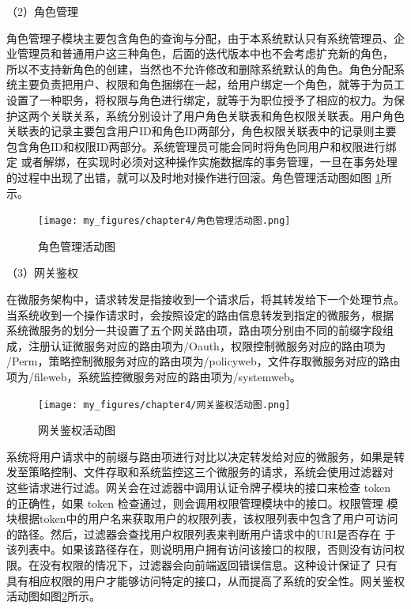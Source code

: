 
（2）角色管理

角色管理子模块主要包含角色的查询与分配，由于本系统默认只有系统管理员、企业管理员和普通用户这三种角色，后面的迭代版本中也不会考虑扩充新的角色，
所以不支持新角色的创建，当然也不允许修改和删除系统默认的角色。角色分配系统主要负责把用户、权限和角色捆绑在一起，给用户绑定一个角色，就等于为员工
设置了一种职务，将权限与角色进行绑定，就等于为职位授予了相应的权力。为保护这两个关联关系，系统分别设计了用户角色关联表和角色权限关联表。用户角色
关联表的记录主要包含用户ID和角色ID两部分，角色权限关联表中的记录则主要包含角色ID和权限ID两部分。系统管理员可能会同时将角色同用户和权限进行绑定
或者解绑，在实现时必须对这种操作实施数据库的事务管理，一旦在事务处理的过程中出现了出错，就可以及时地对操作进行回滚。角色管理活动图如图
\ref{fig:角色管理活动图}所示。

\begin{figure}[h]
    \centering
    \texttt{[image: my\_figures/chapter4/角色管理活动图.png]}
    \caption{角色管理活动图}
    \label{fig:角色管理活动图}
\end{figure}

（3）网关鉴权

在微服务架构中，请求转发是指接收到一个请求后，将其转发给下一个处理节点。当系统收到一个操作请求时，会按照设定的路由信息转发到指定的微服务，根据
系统微服务的划分一共设置了五个网关路由项，路由项分别由不同的前缀字段组成，注册认证微服务对应的路由项为/Oauth，权限控制微服务对应的路由项为
/Perm，策略控制微服务对应的路由项为/policyweb，文件存取微服务对应的路由项为/fileweb，系统监控微服务对应的路由项为/systemweb。

\begin{figure}[h]
    \centering
    \texttt{[image: my\_figures/chapter4/网关鉴权活动图.png]}
    \caption{网关鉴权活动图}
    \label{fig:网关鉴权活动图}
\end{figure}

系统将用户请求中的前缀与路由项进行对比以决定转发给对应的微服务，如果是转发至策略控制、文件存取和系统监控这三个微服务的请求，系统会使用过滤器对
这些请求进行过滤。网关会在过滤器中调用认证令牌子模块的接口来检查 token 的正确性，如果 token 检查通过，则会调用权限管理模块中的接口。权限管理
模块根据token中的用户名来获取用户的权限列表，该权限列表中包含了用户可访问的路径。然后，过滤器会查找用户权限列表来判断用户请求中的URI是否存在
于该列表中。如果该路径存在，则说明用户拥有访问该接口的权限，否则没有访问权限。在没有权限的情况下，过滤器会向前端返回错误信息。这种设计保证了
只有具有相应权限的用户才能够访问特定的接口，从而提高了系统的安全性。网关鉴权活动图如图\ref{fig:网关鉴权活动图}所示。



